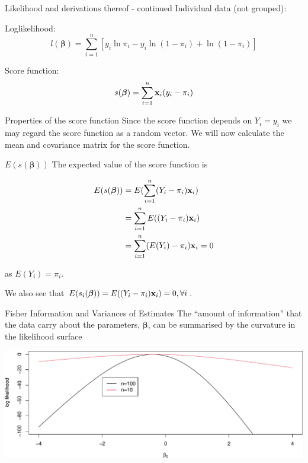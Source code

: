 \documentclass[
  ignorenonframetext,
]{beamer}
\begin{document}
\begin{frame}{Likelihood and derivations thereof - continued}
\label{likelihood-and-derivations-thereof---continued}
Individual data (not grouped):

Loglikelihood:
\[l(\boldsymbol{\beta})=\sum_{i=1}^n[y_i \ln \pi_i-y_i\ln(1-\pi_i)+\ln(1-\pi_i)]\]

Score function:
\[s(\boldsymbol{\beta})=\sum_{i=1}^n {\bf x}_i (y_i-\pi_i)\]
\end{frame}

\begin{frame}
\begin{block}{Properties of the score function}
\label{properties-of-the-score-function}
Since the score function depends on \(Y_i=y_i\) we may regard the score
function as a random vector. We will now calculate the mean and
covariance matrix for the score function.
\end{block}
\end{frame}

\begin{frame}
\begin{block}{\(E(s(\boldsymbol{\beta}))\)}
\label{esboldsymbolbeta}
The expected value of the score function is

\[
\begin{aligned}
E(s(\boldsymbol{\beta})) &= E(\sum_{i=1}^n(Y_i-\pi_i){\bf x}_i) \\
&= \sum_{i=1}^nE((Y_i-\pi_i){\bf x}_i) \\
&= \sum_{i=1}^n(E(Y_i)-\pi_i){\bf x}_i = 0 \\
\end{aligned}
\]

as \(E(Y_i) = \pi_i\).

We also see that
\(E(s_i(\boldsymbol{\beta})) = E((Y_i-\pi_i){\bf x}_i) = 0, \forall i\).
\end{block}
\end{frame}

\begin{frame}
\begin{block}{Fisher Information and Variances of Estimates}
\label{fisher-information-and-variances-of-estimates}
The ``amount of information'' that the data carry about the parameters,
\(\boldsymbol{\beta}\), can be summarised by the curvature in the
likelihood surface

\includegraphics{Module03BinRegPresentationWeek2_files/figure-beamer/Curvature-1.pdf}
\end{block}
\end{frame}
\end{document}
